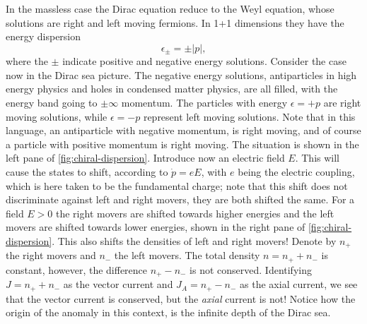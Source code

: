 In the massless case the Dirac equation reduce to the Weyl equation, whose solutions are right and left moving fermions.
In 1+1 dimensions they have the energy dispersion
\[
  \epsilon  _{\pm} = \pm |p|,
\]
where the $\pm$ indicate positive and negative energy solutions.
Consider the case now in the Dirac sea picture.
The negative energy solutions, antiparticles in high energy physics  and holes in condensed matter physics, are all filled, with the energy band going to $\pm \infty $ momentum.
The particles with energy $\epsilon  = +p$ are right moving solutions, while $\epsilon  = -p$ represent left moving solutions.
Note that in this language, an antiparticle with negative momentum, is right moving, and of course a particle with positive momentum is right moving.
The situation is shown in the left pane of \cref{fig:chiral-dispersion}.
Introduce now an electric field \(E\).
This will cause the states to shift, according to $\dot{p} = e E$, with $e$ being the electric coupling, which is here taken to be the fundamental charge;
note that this shift does not discriminate against left and right movers, they are both shifted the same.
For a field $E > 0$ the right movers are shifted towards higher energies and the left movers are shifted towards lower energies, shown in the right pane of \cref{fig:chiral-dispersion}.
This also shifts the densities of left and right movers!
Denote by $n_+$ the right movers and $n_-$ the left movers.
The total density $n = n_+ + n_-$ is constant, however, the difference $n_+ - n_-$ is not conserved.
Identifying $J = n_+ + n_-$ as the vector current and $J_A = n_+  - n_{-}$ as the axial current, we see that the vector current is conserved, but the \emph{axial} current is not!
Notice how the origin of the anomaly in this context, is the infinite depth of the Dirac sea.

